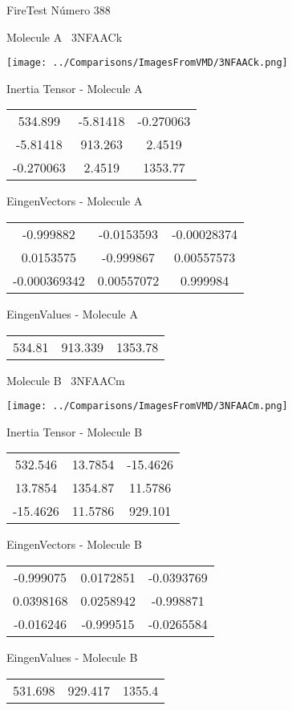 \vtab[-3cm]
\begin{center}
{\large FireTest \tab Número 388}
\end{center}
\begin{multicols}{2}
\begin{center}

Molecule A \
3NFAACk

\texttt{[image: ../Comparisons/ImagesFromVMD/3NFAACk.png]}

Inertia Tensor - Molecule A \\
\begin{tabular}{|c c c|}
534.899	 & 	-5.81418	 & 	-0.270063	 \\
-5.81418	 & 	913.263	 & 	2.4519	 \\
-0.270063	 & 	2.4519	 & 	1353.77
\end{tabular}

\vtab
 EingenVectors - Molecule A     \\
\begin{tabular}{|c c c|}
-0.999882	 & 	-0.0153593	 & 	-0.00028374	 \\
0.0153575	 & 	-0.999867	 & 	0.00557573	 \\
-0.000369342	 & 	0.00557072	 & 	0.999984
\end{tabular}

\vtab
 EingenValues - Molecule A     \\
\begin{tabular}{|c c c|}
534.81	 & 	913.339	 & 	1353.78	 \\
\end{tabular}
\columnbreak

Molecule B \
3NFAACm

\texttt{[image: ../Comparisons/ImagesFromVMD/3NFAACm.png]}

Inertia Tensor - Molecule B \\
\begin{tabular}{|c c c|}
532.546	 & 	13.7854	 & 	-15.4626	 \\
13.7854	 & 	1354.87	 & 	11.5786	 \\
-15.4626	 & 	11.5786	 & 	929.101
\end{tabular}

\vtab
 EingenVectors - Molecule B     \\
\begin{tabular}{|c c c|}
-0.999075	 & 	0.0172851	 & 	-0.0393769	 \\
0.0398168	 & 	0.0258942	 & 	-0.998871	 \\
-0.016246	 & 	-0.999515	 & 	-0.0265584
\end{tabular}

\vtab
 EingenValues - Molecule B     \\
\begin{tabular}{|c c c|}
531.698	 & 	929.417	 & 	1355.4	 \\
\end{tabular}

\end{center}
\end{multicols}

